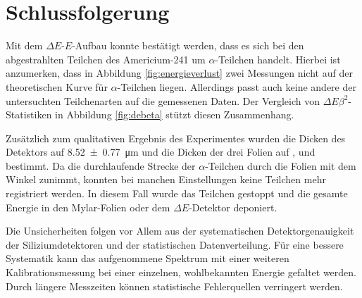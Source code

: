 \section{Schlussfolgerung}

Mit dem $\Delta E$-$E$-Aufbau konnte bestätigt werden, dass es sich bei den abgestrahlten Teilchen des Americium-241 um $\alpha$-Teilchen handelt.
Hierbei ist anzumerken, dass in Abbildung \ref{fig:energieverlust} zwei Messungen nicht auf der theoretischen Kurve für $\alpha$-Teilchen liegen.
Allerdings passt auch keine andere der untersuchten Teilchenarten auf die gemessenen Daten.
Der Vergleich von $\Delta E \beta^2$-Statistiken in Abbildung \ref{fig:debeta} stützt diesen Zusammenhang.

Zusätzlich zum qualitativen Ergebnis des Experimentes wurden die Dicken des Detektors auf \SI{8.52 +- 0.77}{\micro\meter} und die Dicken der drei Folien auf ,  und  bestimmt.
Da die durchlaufende Strecke der $\alpha$-Teilchen durch die Folien mit dem Winkel zunimmt, konnten bei manchen Einstellungen keine Teilchen mehr registriert werden.
In diesem Fall wurde das Teilchen gestoppt und die gesamte Energie in den Mylar-Folien oder dem $\Delta E$-Detektor deponiert.

Die Unsicherheiten folgen vor Allem aus der systematischen Detektorgenauigkeit der Siliziumdetektoren und der statistischen Datenverteilung.
Für eine bessere Systematik kann das aufgenommene Spektrum mit einer weiteren Kalibrationsmessung bei einer einzelnen, wohlbekannten Energie gefaltet werden.
Durch längere Messzeiten können statistische Fehlerquellen verringert werden.
